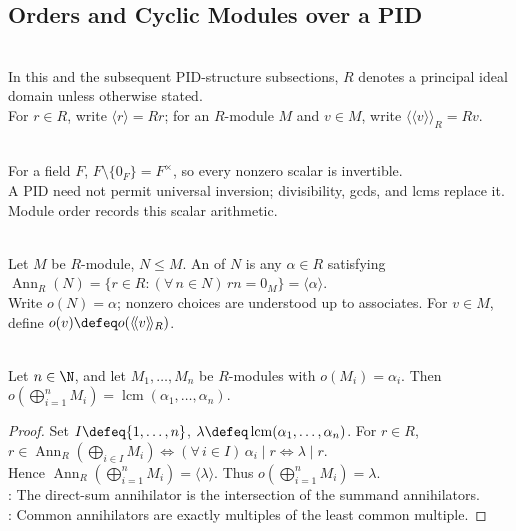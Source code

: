 \subsection{Orders and Cyclic Modules over a PID}

\begin{convention} \label{conv:standing-pid-notation} \\
In this and the subsequent PID-structure subsections, $R$ denotes a principal ideal domain unless otherwise stated.\\
For $r\in R$, write $\langle r\rangle=Rr$; for an $R$-module $M$ and $v\in M$, write $\langle\!\langle v\rangle\!\rangle_R=Rv$.
\end{convention}

\begin{motivation} \label{mot:pid-modules-scalar-arithmetic-controls-structure} \\
For a field $F$, $F\setminus\{0_F\}=F^\times$, so every nonzero scalar is invertible.\\
A PID need not permit universal inversion; divisibility, gcds, and lcms replace it. Module order records this scalar arithmetic.
\end{motivation}

\begin{definition} \label{def:module-order-over-pid} \\
Let $M$ be $R$-module, $N\leq M$. An  of $N$ is any $\alpha\in R$ satisfying $\operatorname{Ann}_R(N)=\{r\in R:(\forall\,n\in N)\,rn=0_M\}=\langle\alpha\rangle$.\\
Write $o(N)=\alpha$; nonzero choices are understood up to associates. For $v\in M$, define $o(v)\defeq o(\langle\!\langle v\rangle\!\rangle_R)$.
\end{definition}

\begin{proposition} \label{prop:orders-direct-sum-lcm} \\
Let $n\in\N$, and let $M_1,\ldots,M_n$ be $R$-modules with $o(M_i)=\alpha_i$. Then $o(\bigoplus\limits_{i=1}^{n}M_i)=\operatorname{lcm}(\alpha_1,\ldots,\alpha_n)$.
\begin{proof}
Set $I\defeq\{1,\ldots,n\}$, $\lambda\defeq\operatorname{lcm}(\alpha_1,\ldots,\alpha_n)$. For $r\in R$, $r\in\operatorname{Ann}_R(\bigoplus\limits_{i\in I}M_i)\Longleftrightarrow(\forall\,i\in I)\,\alpha_i\mid r\Longleftrightarrow\lambda\mid r$.\\
Hence $\operatorname{Ann}_R(\bigoplus\limits_{i=1}^{n}M_i)=\langle\lambda\rangle$. Thus $o(\bigoplus\limits_{i=1}^{n}M_i)=\lambda$.\\
: The direct-sum annihilator is the intersection of the summand annihilators.\\
: Common annihilators are exactly multiples of the least common multiple.
\end{proof}
\end{proposition}


